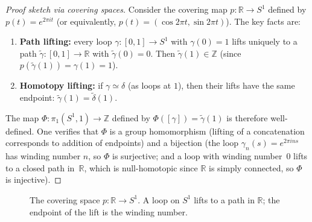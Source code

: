 \documentclass[11pt,a4paper,twoside]{book}
\theoremstyle{remark}
\theoremstyle{definition}
\theoremstyle{definition}
\begin{document}
\begin{proof}[Proof sketch via covering spaces]
Consider the covering map $p\colon\mathbb{R}\to S^1$
defined by $p(t)=e^{2\pi it}$ (or equivalently,
$p(t)=(\cos 2\pi t,\sin 2\pi t)$).  The key facts are:

\begin{enumerate}
  \item \textbf{Path lifting:} every loop
        $\gamma\colon[0,1]\to S^1$ with $\gamma(0)=1$ lifts uniquely to
        a path $\tilde{\gamma}\colon[0,1]\to\mathbb{R}$ with
        $\tilde{\gamma}(0)=0$.  Then $\tilde{\gamma}(1)\in\mathbb{Z}$
        (since $p(\tilde{\gamma}(1))=\gamma(1)=1$).
  \item \textbf{Homotopy lifting:} if
        $\gamma\simeq\delta$ (as loops at $1$), then their lifts have
        the same endpoint: $\tilde{\gamma}(1)=\tilde{\delta}(1)$.
\end{enumerate}

The map $\Phi\colon\pi_1(S^1,1)\to\mathbb{Z}$ defined by
$\Phi([\gamma])=\tilde{\gamma}(1)$ is therefore well-defined.  One
verifies that $\Phi$ is a group homomorphism (lifting of a
concatenation corresponds to addition of endpoints) and a bijection
(the loop $\gamma_n(s)=e^{2\pi i n s}$ has winding number $n$, so
$\Phi$ is surjective; and a loop with winding number~$0$ lifts to a
closed path in~$\mathbb{R}$, which is null-homotopic since
$\mathbb{R}$ is simply connected, so $\Phi$ is injective).
\end{proof}

\begin{figure}[ht]
\centering
{}
\caption{The covering space $p\colon\mathbb{R}\to S^1$.  A loop on
$S^1$ lifts to a path in $\mathbb{R}$; the endpoint of the lift is
the winding number.}
\label{fig:covering-circle}
\end{figure}
\end{document}
